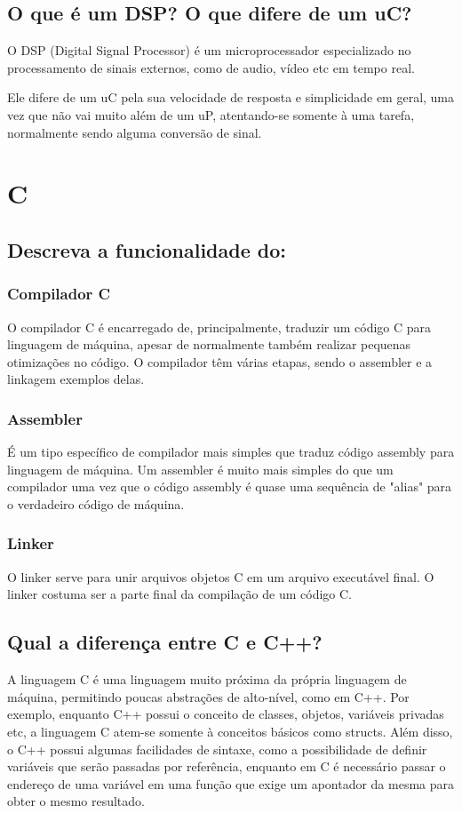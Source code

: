 \documentclass[11pt]{article}
\begin{document}
\subsection{O que é um DSP? O que difere de um uC?}
\label{sec:orgheadline5}
O DSP (Digital Signal Processor) é um microprocessador especializado no
processamento de sinais externos, como de audio, vídeo etc em tempo real.

Ele difere de um uC pela sua velocidade de resposta e simplicidade em geral,
uma vez que não vai muito além de um uP, atentando-se somente à uma tarefa,
normalmente sendo alguma conversão de sinal.

\section{C}
\label{sec:orgheadline12}
\subsection{Descreva a funcionalidade do:}
\label{sec:orgheadline10}
\subsubsection{Compilador C}
\label{sec:orgheadline7}
O compilador C é encarregado de, principalmente, traduzir um código C para
linguagem de máquina, apesar de normalmente também realizar pequenas
otimizações no código. O compilador têm várias etapas, sendo o assembler e a
linkagem exemplos delas.
\subsubsection{Assembler}
\label{sec:orgheadline8}
É um tipo específico de compilador mais simples que traduz código assembly
para linguagem de máquina. Um assembler é muito mais simples do que um
compilador uma vez que o código assembly é quase uma sequência de "alias"
para o verdadeiro código de máquina.
\subsubsection{Linker}
\label{sec:orgheadline9}
O linker serve para unir arquivos objetos C em um arquivo executável final.
O linker costuma ser a parte final da compilação de um código C.
\subsection{Qual a diferença entre C e C++?}
\label{sec:orgheadline11}
A linguagem C é uma linguagem muito próxima da própria linguagem de máquina,
permitindo poucas abstrações de alto-nível, como em C++. Por exemplo, enquanto
C++ possui o conceito de classes, objetos, variáveis privadas etc, a linguagem
C atem-se somente à conceitos básicos como structs. Além disso, o C++ possui
algumas facilidades de sintaxe, como a possibilidade de definir variáveis que
serão passadas por referência, enquanto em C é necessário passar o endereço de
uma variável em uma função que exige um apontador da mesma para obter o mesmo
resultado.
\end{document}
